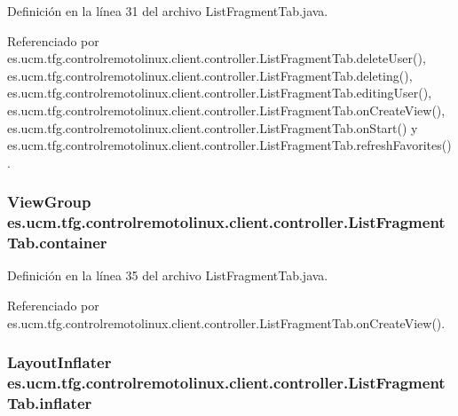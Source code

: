 Definición en la línea 31 del archivo List\-Fragment\-Tab.\-java.



Referenciado por es.\-ucm.\-tfg.\-controlremotolinux.\-client.\-controller.\-List\-Fragment\-Tab.\-delete\-User(), es.\-ucm.\-tfg.\-controlremotolinux.\-client.\-controller.\-List\-Fragment\-Tab.\-deleting(), es.\-ucm.\-tfg.\-controlremotolinux.\-client.\-controller.\-List\-Fragment\-Tab.\-editing\-User(), es.\-ucm.\-tfg.\-controlremotolinux.\-client.\-controller.\-List\-Fragment\-Tab.\-on\-Create\-View(), es.\-ucm.\-tfg.\-controlremotolinux.\-client.\-controller.\-List\-Fragment\-Tab.\-on\-Start() y es.\-ucm.\-tfg.\-controlremotolinux.\-client.\-controller.\-List\-Fragment\-Tab.\-refresh\-Favorites().

\hypertarget{classes_1_1ucm_1_1tfg_1_1controlremotolinux_1_1client_1_1controller_1_1ListFragmentTab_a147ddae2b70e8a0de2bda68af01a002c}{
\subsubsection[{container}]{\setlength{\rightskip}{0pt plus 5cm}View\-Group es.\-ucm.\-tfg.\-controlremotolinux.\-client.\-controller.\-List\-Fragment\-Tab.\-container\hspace{0.3cm}{\ttfamily [private]}}}\label{classes_1_1ucm_1_1tfg_1_1controlremotolinux_1_1client_1_1controller_1_1ListFragmentTab_a147ddae2b70e8a0de2bda68af01a002c}


Definición en la línea 35 del archivo List\-Fragment\-Tab.\-java.



Referenciado por es.\-ucm.\-tfg.\-controlremotolinux.\-client.\-controller.\-List\-Fragment\-Tab.\-on\-Create\-View().

\hypertarget{classes_1_1ucm_1_1tfg_1_1controlremotolinux_1_1client_1_1controller_1_1ListFragmentTab_aa372f69bd7e7da9ef5e3bffdebcf78ed}{
\subsubsection[{inflater}]{\setlength{\rightskip}{0pt plus 5cm}Layout\-Inflater es.\-ucm.\-tfg.\-controlremotolinux.\-client.\-controller.\-List\-Fragment\-Tab.\-inflater\hspace{0.3cm}{\ttfamily [private]}}}\label{classes_1_1ucm_1_1tfg_1_1controlremotolinux_1_1client_1_1controller_1_1ListFragmentTab_aa372f69bd7e7da9ef5e3bffdebcf78ed}


